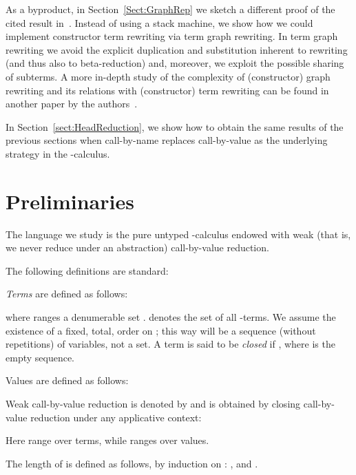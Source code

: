 \documentclass{LMCS}
\newenvironment{varitemize}
{
\begin{list}{\labelitemi}
{\setlength{\itemsep}{0.0mm}
 \setlength{\topsep}{0.0mm}
 \setlength{\parindent}{0.0mm}
 \setlength{\parskip}{0.0mm}
 \setlength{\parsep}{0.0mm}
 \setlength{\partopsep}{0.0mm}
 \setlength{\leftmargin}{15pt}
 \setlength{\labelsep}{5pt}
 \setlength{\labelwidth}{10pt}}}
{
 \end{list} 
}
\begin{document}
As a byproduct, in Section~\ref{Sect:GraphRep} we sketch a different proof
of the cited result in~\cite{Sands:Lambda02}. Instead of using a stack machine, 
we show how we could implement
constructor term rewriting via term graph rewriting. In term graph rewriting we
avoid the explicit duplication and substitution inherent to
rewriting (and thus also to beta-reduction) and, moreover, we exploit the possible sharing of subterms. 
A more in-depth study of the complexity of 
(constructor) graph rewriting and its relations with (constructor) term rewriting can be found in another
paper by the authors~\cite{DLM09}.

In Section~\ref{sect:HeadReduction}, we show how to obtain the same results of the previous sections when 
call-by-name replaces call-by-value as the underlying strategy in the -calculus.



\section{Preliminaries}\label{sect:prelim}
The language we study is the pure untyped
-calculus endowed with weak (that is, we never reduce
under an abstraction)
call-by-value reduction. 
\begin{defi}
The following definitions are standard:
\begin{varitemize}
  \item
    \emph{Terms} are defined as follows:
    
    where  ranges a denumerable set .
     denotes the set of all -terms.
    We assume the existence of a fixed, total, order on ; this
    way  will be a sequence (without repetitions) of variables, not a set. A term
     is said to be \emph{closed} if ,
    where  is the empty sequence.
  \item
    Values are defined as follows:
    
\item
    Weak call-by-value reduction is denoted by 
    and is obtained by closing call-by-value reduction under
    any applicative context:
    
    Here  range over terms, while  ranges over values.
  \item
    The length  of  is defined as follows, by induction
    on : ,  
    and .
\end{varitemize}
\end{defi}
\end{document}
